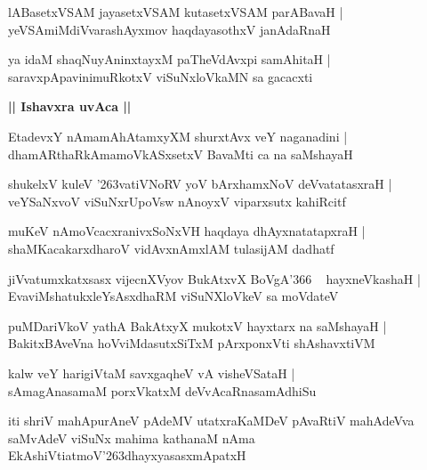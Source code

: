 \documentclass[twoside,12pt,openright]{book}
\def\S{\char'263}
\newcounter{shloka}[chapter]
\def\uvaca#1{\centerline{{\large\textbf{#1}}}}
\begin{document}
\begin{shloka}%
lABasetxVSAM jayasetxVSAM kutasetxVSAM parABavaH |\\
yeVSAmiMdiVvarashAyxmov haqdayasothxV janAdaRnaH 
\end{shloka}

\begin{shloka}%
ya idaM shaqNuyAninxtayxM paTheVdAvxpi samAhitaH |\\
saravxpApavinimuRkotxV viSuNxloVkaMN sa gacacxti
\end{shloka}

\uvaca{|| Ishavxra uvAca ||}

\begin{shloka}%
EtadevxY nAmamAhAtamxyXM shurxtAvx veY naganadini |\\
dhamARthaRkAmamoVkASxsetxV BavaMti ca na saMshayaH 
\end{shloka}

\begin{shloka}%
shukelxV kuleV \S vatiVNoRV yoV bArxhamxNoV deVvatatasxraH |\\
veYSaNxvoV viSuNxrUpoVsw nAnoyxV viparxsutx kahiRcitf 
\end{shloka}

\begin{shloka}%
muKeV nAmoVcacxranivxSoNxVH haqdaya dhAyxnatatapxraH |\\
shaMKacakarxdharoV vidAvxnAmxlAM tulasijAM dadhatf
\end{shloka}

\begin{shloka}%
jiVvatumxkatxsasx vijecnXVyov BukAtxvX BoVgA\char'366 ~ hayxneVkashaH |\\
EvaviMshatukxleYsAsxdhaRM viSuNXloVkeV sa moVdateV 
\end{shloka}

\begin{shloka}%
puMDariVkoV yathA BakAtxyX mukotxV hayxtarx na saMshayaH |\\
BakitxBAveVna hoVviMdasutxSiTxM pArxponxVti shAshavxtiVM 
\end{shloka}

\begin{shloka}%
kalw veY harigiVtaM savxgaqheV vA visheVSataH |\\
sAmagAnasamaM porxVkatxM deVvAcaRnasamAdhiSu
\end{shloka}

\begin{center}
iti shriV mahApurAneV pAdeMV utatxraKaMDeV pAvaRtiV mahAdeVva saMvAdeV viSuNx mahima kathanaM nAma 
EkAshiVtiatmoV\S dhayxyasasxmApatxH 
\end{center}
\end{document}
